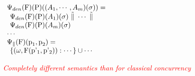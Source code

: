 \documentclass[portrait,final,a0paper]{nadiposter}
\begin{document}
\begin{poster}
{\( \begin{array}{l}
     \mbox{$\Psi_{den}$} (\mbox{F}) (\mbox{P}) ( (A_{1},\cdots,A_{m})(\sigma) )
     = \\ \hspace*{1ex} 
     \mbox{$\Psi_{den}$} (\mbox{F}) (\mbox{P}) (A_{1})(\sigma)  
     \mbox{ $ \tilde{\parallel} $ }
     \cdots
     \mbox{ $ \tilde{\parallel} $ } \mbox{ } \\ \hspace*{1ex}
     \mbox{$\Psi_{den}$} (\mbox{F}) (\mbox{P}) (A_{m})(\sigma)
     \\ \cdots
     \\
     \mbox{$\Psi_{\parallel}$}(\mbox{F})(\mbox{p}_{1},\mbox{p}_{2}) = \\ \hspace*{1ex}
        \{ (\omega,\mbox{F}(\mbox{p'$_{1}$},\mbox{p'$_{2}$})) : \cdots \} \cup \cdots \mbox{ }
\end{array} \)


\begin{center}
\textit{\textcolor{red}{Completely different semantics than
for classical concurrency}}
\end{center}


}



\newcommand{\seqcc}[2]{ {#1} \; ; \; {#2} }
\newcommand{\paracc}[2]{ {#1} \; || \; {#2} }
\newcommand{\choicecc}[2]{ {#1} \; + \; {#2} }

\newcommand{\choicec}{ +  }

\newcommand{\bset}{ \{ }
\newcommand{\eset}{ \} }
\def\Scvar{\mathit{Scvar}}
\def\Sstring{\mathit{Sstring}}
\def\Scpterm{\mathit{Scpterm}}

\newcommand{\conf}[2]{ {<} {#1}, {#2} {>} }
\newcommand{\trans}[2]{ {#1} \longrightarrow {#2} }
\newcommand{\transm}[2]{ {#1} \longrightarrow {#2} } 

\newcommand{\bmset}{ \{ }
\newcommand{\emset}{ \} }

\newcommand{\infrule}[2]{%
 \begin{array}{c}
       {#1} \\
       \hline
       {#2}
\end{array}
}

\end{poster}
\end{document}
